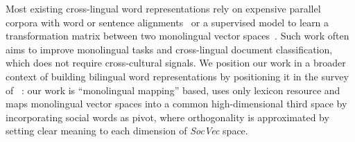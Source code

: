 Most existing cross-lingual word representations  
rely on expensive parallel corpora with word or sentence 
alignments~\cite{klementiev2012inducing,kovcisky2014learning} or  a 
supervised model to learn a transformation matrix between two monolingual 
vector spaces~\cite{Mikolov:2013tp}. 
Such work often aims to improve monolingual tasks and cross-lingual 
document classification, which does not require cross-cultural signals. 
We position our work in a broader context of building bilingual word representations by positioning it in the survey of ~\cite{DBLP:journals/corr/Ruder17}: 
our work is ``monolingual mapping'' based, uses only lexicon resource and 
maps monolingual vector spaces into a common high-dimensional third space 
by incorporating social words as pivot, where orthogonality is 
approximated by setting clear meaning to each dimension 
of \textit{SocVec} space.
